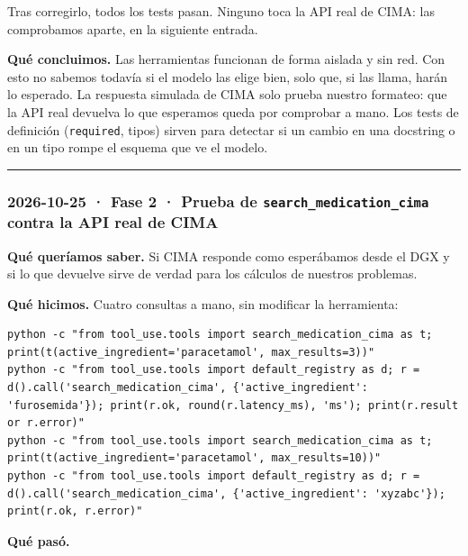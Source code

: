 Tras corregirlo, todos los tests pasan. Ninguno toca la API real de CIMA: las comprobamos aparte,
en la siguiente entrada.

\textbf{Qué concluimos.} Las herramientas funcionan de forma aislada y sin red. Con esto no sabemos
todavía si el modelo las elige bien, solo que, si las llama, harán lo esperado. La respuesta
simulada de CIMA solo prueba nuestro formateo: que la API real devuelva lo que esperamos queda
por comprobar a mano. Los tests de
definición (\texttt{required}, tipos) sirven para detectar si un cambio en una docstring o en un tipo
rompe el esquema que ve el modelo.

\begin{center}\rule{0.5\linewidth}{0.5pt}\end{center}

\subsubsection{\texorpdfstring{2026-10-25 · Fase 2 · Prueba de \texttt{search\_\allowbreak{}medication\_\allowbreak{}cima} contra la API real de CIMA}{2026-10-25 · Fase 2 · Prueba de search\_\allowbreak{}medication\_\allowbreak{}cima contra la API real de CIMA}}

\textbf{Qué queríamos saber.} Si CIMA responde como esperábamos desde el DGX y si lo que devuelve
sirve de verdad para los cálculos de nuestros problemas.

\textbf{Qué hicimos.} Cuatro consultas a mano, sin modificar la herramienta:

\begin{lstlisting}
python -c "from tool_use.tools import search_medication_cima as t; print(t(active_ingredient='paracetamol', max_results=3))"
python -c "from tool_use.tools import default_registry as d; r = d().call('search_medication_cima', {'active_ingredient': 'furosemida'}); print(r.ok, round(r.latency_ms), 'ms'); print(r.result or r.error)"
python -c "from tool_use.tools import search_medication_cima as t; print(t(active_ingredient='paracetamol', max_results=10))"
python -c "from tool_use.tools import default_registry as d; r = d().call('search_medication_cima', {'active_ingredient': 'xyzabc'}); print(r.ok, r.error)"
\end{lstlisting}

\textbf{Qué pasó.}

